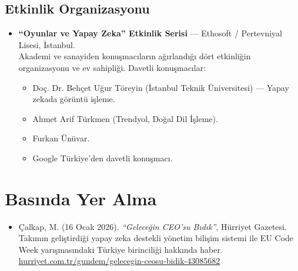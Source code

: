 \documentclass[11pt,a4paper]{article}
\begin{document}
\subsection*{Etkinlik Organizasyonu}
\begin{itemize}
    \item \textbf{``Oyunlar ve Yapay Zeka'' Etkinlik Serisi} --- Ethosoft / Pertevniyal Lisesi, İstanbul. \\
    Akademi ve sanayiden konuşmacıların ağırlandığı dört etkinliğin organizasyonu ve ev sahipliği. Davetli konuşmacılar:
    \begin{itemize}
        \item Doç. Dr. Behçet Uğur Töreyin (İstanbul Teknik Üniversitesi) --- Yapay zekada görüntü işleme.
        \item Ahmet Arif Türkmen (Trendyol, Doğal Dil İşleme).
        \item Furkan Ünüvar.
        \item Google Türkiye'den davetli konuşmacı.
    \end{itemize}
\end{itemize}

\section*{Basında Yer Alma}
\begin{itemize}
    \item Çalkap, M. (16 Ocak 2026). \textit{``Geleceğin CEO'su Bıdık''}, Hürriyet Gazetesi. \\
    Takımın geliştirdiği yapay zeka destekli yönetim bilişim sistemi ile EU Code Week yarışmasındaki Türkiye birinciliği hakkında haber. \\
    \href{https://www.hurriyet.com.tr/gundem/gelecegin-ceosu-bidik-43085682}{hurriyet.com.tr/gundem/gelecegin-ceosu-bidik-43085682}
\end{itemize}

\end{document}
